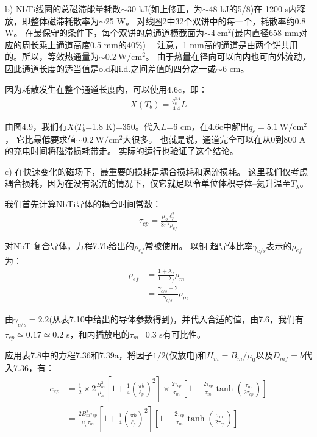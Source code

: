 b) NbTi线圈的总磁滞能量耗散$\sim$30 kJ(如上修正，为$\sim$48 kJ的5/8)在
1200 s内释放，即整体磁滞耗散率为$\sim$25 W。
对线圈2中32个双饼中的每一个，耗散率约0.8 W。
在最保守的条件下，每个双饼的总通道横截面为$\sim 4\ \mathrm{cm^2}$(最内直径658 mm对应的周长乘上通道高度0.5 mm的40\%)---
注意，1 mm高的通道是由两个饼共用的。所以，等效热通量为$\sim 0.2\ \mathrm{W/cm^2}$。
由于热量在径向可以向内也可向外流动，因此通道长度的适当值是o.d和i.d.之间差值的四分之一或$\sim$6 cm。

因为耗散发生在整个通道长度内，可以使用4.6c，即：
\begin{align*}%
X(T_b)=\frac{q_{c}^{3.4}}{4.4}L \tag{4.6c}
\end{align*}

由图4.9，我们有$X(T_b$=1.8 K)=350。代入$L$=6 cm，在4.6c中解出$q_c=5.1\ \mathrm{W/cm^2}$，
它比最低要求值$\sim 0.2\ \mathrm{W/cm^2}$大很多。
也就是说，通道完全可以在从0到800 A的充电时间将磁滞损耗带走。
实际的运行也验证了这个结论。

c) 在快速变化的磁场下，最重要的损耗是耦合损耗和涡流损耗。
这里我们仅考虑耦合损耗，因为在没有涡流的情况下，仅它就足以令单位体积导体--氦升温至$T_\lambda$。

我们首先计算NbTi导体的耦合时间常数：
\begin{align*}%
\tau_{cp}=\frac{\mu_o\ell_{p}^{2}}{8\pi^2\rho_{ef}} \tag{7.6}
\end{align*}

对NbTi复合导体，方程7.7b给出的$\rho_{ef}$常被使用。
以铜-超导体比率$\gamma_{c/s}$表示的$\rho_{ef}$为：
\begin{align*}%
\rho_{ef}&=\frac{1+\lambda_f}{1-\lambda_f}\rho_{m} \\
&=\frac{\gamma_{c/s}+2}{\gamma_{c/s}}\rho_{m} \tag{S7.4}
\end{align*}

由$\gamma_{c/s}=2.2$(从表7.10中给出的导体参数得到)，并代入合适的值，由7.6，我们有$\tau_{cp}\simeq 0.17\simeq 0.2$ s，和内插放电的$\tau_m$=0.3 s有可比性。

应用表7.8中的方程7.36和7.39a，将因子$1/2$(仅放电)和$H_m=B_m/\mu_0$以及$D_{mf}=b$代入7.36，有：
\begin{align*}%
e_{cp}&=\frac{1}{2}\times 2\frac{B_{m}^{2}}{\mu_o}\left[1+\frac{1}{4}\left(\frac{\pi b}{\ell_{p}}\right)^2\right]\times\frac{2\tau_{cp}}{\tau_m}\left[1-\frac{2\tau_{cp}}{\tau_m}\tanh\left(\frac{\tau_m}{2\tau_{cp}}\right)\right] \\
&=\frac{2B_{m}^{2}\tau_{cp}}{\mu_o\tau_m}\left[1+\frac{1}{4}\left(\frac{\pi b}{\ell_{p}}\right)^2\right]\left[1-\frac{2\tau_{cp}}{\tau_m}\tanh\left(\frac{\tau_m}{2\tau_{cp}}\right)\right] \tag{S7.5b}
\end{align*}

